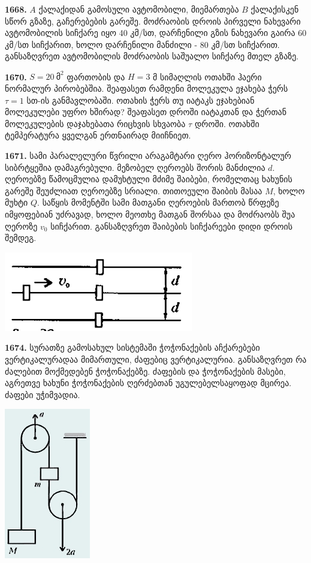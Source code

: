 \documentclass[12pt,a4paper,]{report}
\begin{document}
\textbf{1668.} $A$ ქალაქიდან გამოსული ავტომობილი, მიემართება $B$ ქალაქისკენ სწორ გზაზე, გაჩერებების გარეშე. მოძრაობის დროის პირველი ნახევარი ავტომობილის სიჩქარე იყო 40 კმ/სთ, დარჩენილი გზის ნახევარი გაირა 60 კმ/სთ სიჩქარით, ხოლო დარჩენილი მანძილი - 80 კმ/სთ სიჩქარით. განსაზღვრეთ ავტომობილის მოძრაობის საშუალო სიჩქარე მთელ გზაზე. 

\textbf{1670.} $S = 20\ \text{მ}^2$ ფართობის და $H = 3$ მ სიმაღლის ოთახში ჰაერი ნორმალურ პირობებშია. შეაფასეთ რამდენი მოლეკულა ეჯახება ჭერს $\tau = 1$ სთ-ის განმავლობაში. ოთახის ჭერს თუ იატაკს ეჯახებიან მოლეკულები უფრო ხშირად? შეაფასეთ   დროში იატაკთან და ჭერთან მოლეკულების დაჯახებათა რიცხვის სხვაობა $\tau$ დროში. ოთახში ტემპერატურა ყველგან ერთნაირად მიიჩნიეთ.

\textbf{1671.} სამი პარალელური წვრილი არაგამტარი ღერო ჰორიზონტალურ სიბრტყეშია დამაგრებული. მეზობელ ღეროებს შორის მანძილია $d$. ღეროებზე წამოცმულია დამუხტული მძიმე შაიბები, რომელთაც ხახუნის გარეშე შეუძლიათ ღეროებზე სრიალი. თითოეული შაიბის მასაა $M$, ხოლო მუხტი $Q$. საწყის მომენტში სამი მათგანი ღეროების მართობ წრფეზე იმყოფებიან უძრავად, ხოლო მეოთხე მათგან შორსაა და მოძრაობს შუა ღეროზე $v_0$ სიჩქარით. განსაზღვრეთ შაიბების სიჩქარეები დიდი დროის შემდეგ. 
		\begin{center}
			\includegraphics[scale=0.5]{images/F1671}
		\end{center}

\textbf{1674.} სურათზე გამოსახულ სისტემაში ჭოჭონაქების აჩქარებები ვერტიკალურადაა მიმართული, ძაფებიც ვერტიკალურია. განსაზღვრეთ რა ძალებით მოქმედებენ ჭოჭონაქებზე. ძაფების და ჭოჭონაქების მასები, აგრეთვე ხახუნი ჭოჭონაქების ღერძებთან უგულებელსაყოფად მცირეა. ძაფები უჭიმვადია.
		\begin{center}
			\includegraphics[scale=0.5]{images/F1674}
		\end{center}
\end{document}
